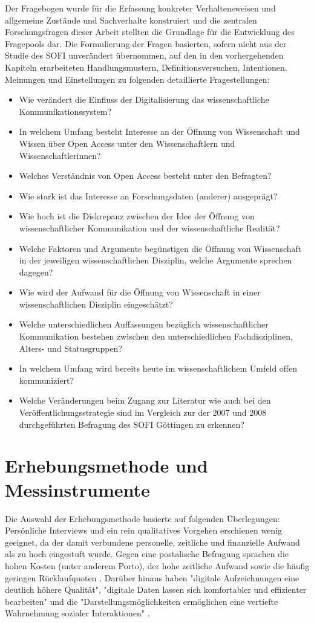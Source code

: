 Der Fragebogen wurde für die Erfassung konkreter Verhaltensweisen und allgemeine Zustände und Sachverhalte \cite{raab_2012_fragebogen} konstruiert und die zentralen Forschungsfragen dieser Arbeit stellten die Grundlage für die Entwicklung des Fragepools dar. Die Formulierung der Fragen basierten, sofern nicht aus der Studie des SOFI unverändert übernommen, auf den in den vorhergehenden Kapiteln erarbeiteten Handlungsmustern, Definitionsversuchen, Intentionen, Meinungen und Einstellungen zu folgenden detaillierte Fragestellungen:
\begin{itemize}
\item Wie verändert die Einfluss der Digitalisierung das wissenschaftliche Kommunikationssystem?
\item In welchem Umfang besteht Interesse an der Öffnung von Wissenschaft und Wissen über Open Access unter den Wissenschaftlern und Wissenschaftlerinnen?
\item Welches Verständnis von Open Access besteht unter den Befragten?
\item Wie stark ist das Interesse an Forschungsdaten (anderer) ausgeprägt?
\item Wie hoch ist die Diskrepanz zwischen der Idee der Öffnung von wissenschaftlicher Kommunikation und der wissenschaftliche Realität?
\item Welche Faktoren und Argumente begünstigen die Öffnung von Wissenschaft in der jeweiligen wissenschaftlichen Disziplin, welche Argumente sprechen dagegen?
\item Wie wird der Aufwand für die Öffnung von Wissenschaft in einer wissenschaftlichen Disziplin eingeschätzt?
\item Welche unterschiedlichen Auffassungen bezüglich wissenschaftlicher Kommunikation bestehen zwischen den unterschiedlichen Fachdisziplinen, Alters- und Statusgruppen?
\item In welchem Umfang wird bereits heute im wissenschaftlichem Umfeld offen kommuniziert?
\item Welche Veränderungen beim Zugang zur Literatur wie auch bei den Veröffentlichungsstrategie sind im Vergleich zur der 2007 und 2008 durchgeführten Befragung des SOFI Göttingen zu erkennen?
\end{itemize}

\section{Erhebungsmethode und Messinstrumente}

Die Auswahl der Erhebungsmethode basierte auf folgenden Überlegungen: Persönliche Interviews und ein rein qualitatives Vorgehen erschienen wenig geeignet, da der damit verbundene personelle, zeitliche und finanzielle Aufwand als zu hoch eingestuft wurde. Gegen eine postalische Befragung sprachen die hohen Kosten (unter anderem Porto), der hohe zeitliche Aufwand sowie die häufig geringen Rücklaufquoten \cite{suchen}. Darüber hinaus haben "digitale Aufzeichnungen eine deutlich höhere Qualität", "digitale Daten lassen sich komfortabler und effizienter bearbeiten" und die "Darstellungsmöglichkeiten ermöglichen eine vertiefte Wahrnehmung sozialer Interaktionen" \cite{Hartung_2011_digitalisierung}.

